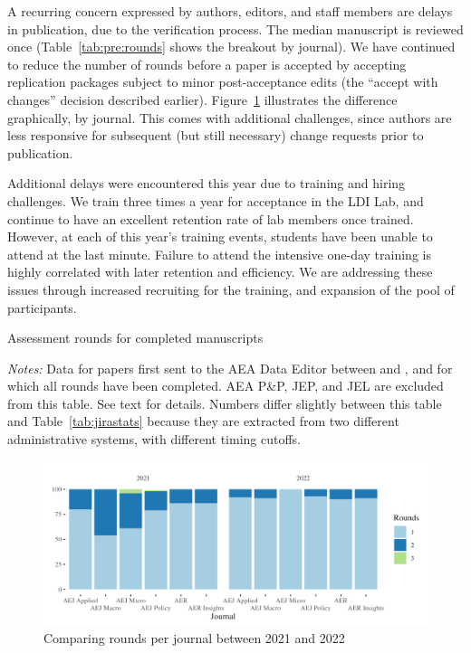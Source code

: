 A recurring concern expressed by authors, editors, and staff members are delays in publication, due to the verification process. The median manuscript is reviewed once (Table~\ref{tab:pre:rounds} shows the breakout by journal).
%
We have continued to reduce the number of rounds before a paper is accepted by accepting replication packages subject to minor post-acceptance edits (the ``accept with changes'' decision described earlier). Figure~\ref{fig:rounds} illustrates the difference graphically, by journal. This comes with additional challenges, since authors are less responsive for subsequent (but still necessary) change requests prior to publication. 

Additional delays were encountered this year due to training and hiring challenges. We train three times a year for acceptance in the LDI Lab, and continue to have an excellent retention rate of lab members once trained. However, at each of this year's training events, students have been unable to attend at the last minute. Failure to attend the intensive one-day training is highly correlated with later retention and efficiency. We are addressing these issues through increased recruiting for the training, and expansion of the pool of participants.



\begin{table}
    \centering
    \caption{Assessment rounds for completed manuscripts}
    \label{tab:pre:rounds}
    \begin{threeparttable}
    \centering
    
    \begin{tablenotes}
    \footnotesize
    \item[] \textit{Notes:} Data for papers first sent to the AEA Data Editor between \firstday{} and \lastday{}, and for which all rounds have been completed. AEA P\&P, JEP, and JEL are excluded from this table. See text for details. Numbers differ slightly between this table and Table~\ref{tab:jirastats} because they are extracted from two different administrative systems, with different timing cutoffs.
    \end{tablenotes}
 \end{threeparttable}
\end{table}

\begin{figure}
    \includegraphics[width=\textwidth]{images/plot_rounds_compare.png}
    \centering
    \caption{Comparing rounds per journal between 2021 and 2022\label{fig:rounds}}
\end{figure}

